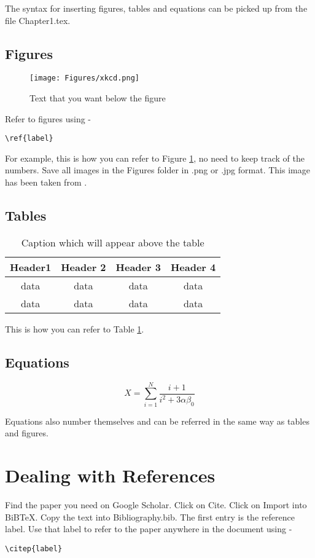 The syntax for inserting figures, tables and equations can be picked up from the file Chapter1.tex.

\subsection{Figures}

\begin{figure}
\centering
\texttt{[image: Figures/xkcd.png]}
\caption[Text that you want on the list of figures page]{Text that you want below the figure}
\label{fig:nameForThisFigure}
\end{figure}

Refer to figures using - \begin{verbatim}\ref{label} \end{verbatim} For example, this is how you can refer to Figure \ref{fig:nameForThisFigure}, no need to keep track of the numbers. Save all images in the Figures folder in .png or .jpg format. This image has been taken from \citep{xkcd}.

\subsection{Tables}

\begin{table}
\centering
\caption[Text that you want on the list of tables page]{Caption which will appear above the table}

\begin{tabular}{c|c|c|c}
Header1 & Header 2 & Header 3 & Header 4 \\ \hline
data & data & data & data \\
data & data & data & data \\ \hline
\end{tabular}

\label{tab:nameForThisTable}
\end{table}
 
This is how you can refer to Table \ref{tab:nameForThisTable}.

\subsection{Equations}

\begin{equation}
X = \sum_{i=1}^{N}{\frac{i+1}{i^2 + 3\alpha\beta_0}}
\label{eqn: equationLabel}
\end{equation}

Equations also number themselves and can be referred in the same way as tables and figures.

\section{Dealing with References}

Find the paper you need on Google Scholar. Click on Cite. Click on Import into BiBTeX. Copy the text into Bibliography.bib. The first entry is the reference label. Use that label to refer to the paper anywhere in the document using - 
\begin{verbatim}
\citep{label}
\end{verbatim}
